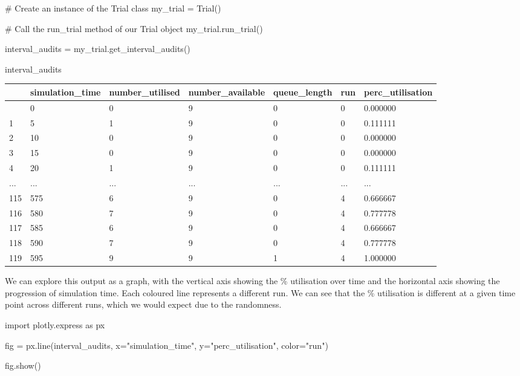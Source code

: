 \documentclass[
  letterpaper,
  DIV=11,
  numbers=noendperiod]{scrreprt}
\newenvironment{Shaded}{\begin{snugshade}}{\end{snugshade}}
\newcommand{\CommentTok}[1]{\textcolor[rgb]{0.37,0.37,0.37}{#1}}
\newcommand{\ImportTok}[1]{\textcolor[rgb]{0.00,0.46,0.62}{#1}}
\newcommand{\NormalTok}[1]{\textcolor[rgb]{0.00,0.23,0.31}{#1}}
\newcommand{\OperatorTok}[1]{\textcolor[rgb]{0.37,0.37,0.37}{#1}}
\newcommand{\StringTok}[1]{\textcolor[rgb]{0.13,0.47,0.30}{#1}}
\begin{document}
\begin{Shaded}
\begin{Highlighting}[]
\CommentTok{\# Create an instance of the Trial class}
\NormalTok{my\_trial }\OperatorTok{=}\NormalTok{ Trial()}

\CommentTok{\# Call the run\_trial method of our Trial object}
\NormalTok{my\_trial.run\_trial()}

\NormalTok{interval\_audits }\OperatorTok{=}\NormalTok{ my\_trial.get\_interval\_audits()}

\NormalTok{interval\_audits}
\end{Highlighting}
\end{Shaded}

\begin{longtable}[]{@{}lllllll@{}}
\toprule\noalign{}
& simulation\_time & number\_utilised & number\_available &
queue\_length & run & perc\_utilisation \\
\midrule\noalign{}
\endhead
\bottomrule\noalign{}
\endlastfoot
0 & 0 & 0 & 9 & 0 & 0 & 0.000000 \\
1 & 5 & 1 & 9 & 0 & 0 & 0.111111 \\
2 & 10 & 0 & 9 & 0 & 0 & 0.000000 \\
3 & 15 & 0 & 9 & 0 & 0 & 0.000000 \\
4 & 20 & 1 & 9 & 0 & 0 & 0.111111 \\
... & ... & ... & ... & ... & ... & ... \\
115 & 575 & 6 & 9 & 0 & 4 & 0.666667 \\
116 & 580 & 7 & 9 & 0 & 4 & 0.777778 \\
117 & 585 & 6 & 9 & 0 & 4 & 0.666667 \\
118 & 590 & 7 & 9 & 0 & 4 & 0.777778 \\
119 & 595 & 9 & 9 & 1 & 4 & 1.000000 \\
\end{longtable}

We can explore this output as a graph, with the vertical axis showing
the \% utilisation over time and the horizontal axis showing the
progression of simulation time. Each coloured line represents a
different run. We can see that the \% utilisation is different at a
given time point across different runs, which we would expect due to the
randomness.

\begin{Shaded}
\begin{Highlighting}[]
\ImportTok{import}\NormalTok{ plotly.express }\ImportTok{as}\NormalTok{ px}

\NormalTok{fig }\OperatorTok{=}\NormalTok{ px.line(interval\_audits, x}\OperatorTok{=}\StringTok{"simulation\_time"}\NormalTok{, y}\OperatorTok{=}\StringTok{"perc\_utilisation"}\NormalTok{, color}\OperatorTok{=}\StringTok{"run"}\NormalTok{)}

\NormalTok{fig.show()}
\end{Highlighting}
\end{Shaded}
\end{document}

